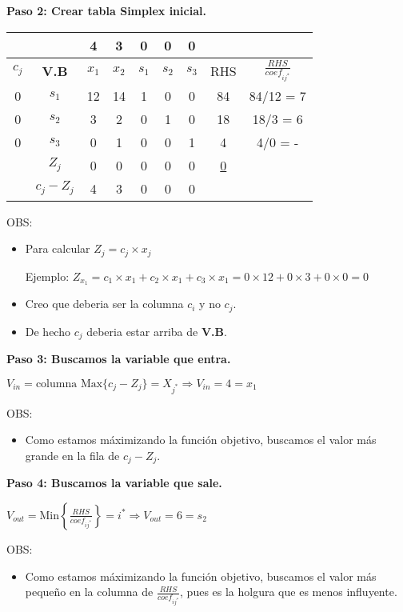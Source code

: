 \documentclass{templateNote}
\begin{document}
\textbf{Paso 2: Crear tabla Simplex inicial.}
\begin{center}
    \begin{tabular}{|c|c|c|c|c|c|c|c|c|}
        \hline
        & & 4 & 3 & 0 & 0 & 0 &  &  \\ \hline
        $c_j$ & \textbf{V.B} & $x_1$ & $x_2$ & $s_1$ & $s_2$ & $s_3$ & RHS & $\displaystyle\frac{RHS}{coef_{ij^*}}$ \\ \hline
        0 & $s_1$ & 12 & 14 & 1 & 0 & 0 & 84 & 84/12 = 7 \\ \hline
        0 & $s_2$ & 3 & 2 & 0 & 1 & 0 & 18 & 18/3 = 6 \\ \hline
        0 & $s_3$ & 0 & 1 & 0 & 0 & 1 & 4 & 4/0 = - \\ \hline
        & $Z_j$ & 0 & 0 & 0 & 0 & 0 & \underline{0} &  \\ \hline
        & $c_j - Z_j$ & 4 & 3 & 0 & 0 & 0 &  &  \\ \hline
    \end{tabular}
\end{center}
OBS:
\begin{itemize}
    \item Para calcular $Z_j = c_j \times x_j $
    \begin{center}
        Ejemplo: $Z_{x_1} = c_1 \times x_1 + c_2 \times x_1 + c_3 \times x_1 = 0 \times 12 + 0 \times 3 + 0 \times 0 = 0$
    \end{center}

    \item Creo que deberia ser la columna $c_i$ y no $c_j$.
    \item De hecho $c_j$ deberia estar arriba de \textbf{V.B}.
\end{itemize}

\textbf{Paso 3: Buscamos la variable que entra.}
\begin{center}
    $V_{in} = \text{columna Max} \{c_j-Z_j\} = X_{j^*} \Rightarrow V_{in} = 4 = x_1$
\end{center}
OBS:
\begin{itemize}
    \item Como estamos máximizando la función objetivo, buscamos el valor más grande en la fila de $c_j - Z_j$.
\end{itemize}

\textbf{Paso 4: Buscamos la variable que sale.}
\begin{center}
    $V_{out} = \text{Min} \left\{ \frac{RHS}{coef_{ij^*}} \right\} = i^* \Rightarrow V_{out} = 6 = s_2$
\end{center}
OBS:
\begin{itemize}
    \item Como estamos máximizando la función objetivo, buscamos el valor más pequeño en la columna de $\displaystyle\frac{RHS}{coef_{ij^*}}$, pues es la holgura que es menos influyente.
\end{itemize}
\end{document}
